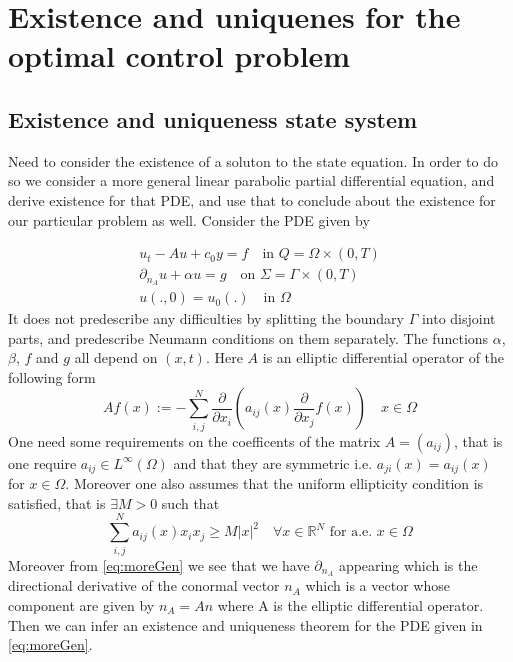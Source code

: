 \section{Existence and uniquenes for the optimal control problem}\label{proof}

\subsection{Existence and uniqueness state system}
Need to consider the existence of a soluton to the state equation. In order to do so we consider a more general linear parabolic partial differential equation, and derive existence for that PDE, and use that to conclude about the existence for our particular problem as well. Consider the PDE given by

\begin{align}
    \label{eq:moreGen}
    u_t - Au + c_0 y = f \quad \text{in } Q = \Omega \times (0,T) \\
    \partial_{n_A} u + \alpha u = g \quad \text{on } \Sigma = \Gamma \times (0,T) \\
    u(.,0) = u_0(.) \quad \text{in } \Omega
\end{align}
It does not predescribe any difficulties by splitting the boundary $\Gamma$ into disjoint parts, and predescribe Neumann conditions on them separately. The functions $\alpha$, $\beta$, $f$ and $g$ all depend on $(x,t)$. Here $A$ is an elliptic differential operator of the following form
%
\begin{equation*}
    Af(x) := -\sum_{i,j}^N\frac{\partial}{\partial x_i}(a_{ij}(x)\frac{\partial}{\partial x_j}f(x)) \quad x\in \Omega
\end{equation*}
One need some requirements on the coefficents of the matrix $A=(a_{ij})$, that is one require $a_{ij} \in L^{\infty}(\Omega)$ and that they are symmetric i.e. $a_{ji}(x) = a_{ij}(x)$ for $x\in \Omega$. Moreover one also assumes that the uniform ellipticity condition is satisfied, that is $\exists M>0$ such that 
\begin{equation*}
    \label{eq:uniformEl}
    \sum_{i,j}^N a_{ij}(x)x_i x_j \geq M|x|^2 \quad \forall x \in \mathbb{R}^N \text{ for a.e. $x\in \Omega$}
\end{equation*}
Moreover from \eqref{eq:moreGen} we see that we have $\partial_{n_A}$ appearing which is the directional derivative of the conormal vector $n_{A}$ which is a vector whose component are given by $n_{A} = An$ where A is the elliptic differential operator. Then we can infer an existence and uniqueness theorem for the PDE given in \eqref{eq:moreGen}. 

